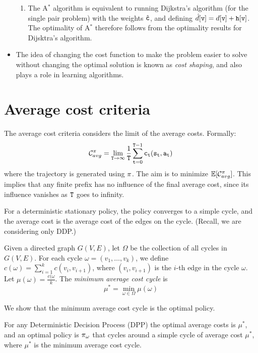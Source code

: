 \begin{itemize}
\begin{enumerate}
      \item The A$^*$ algorithm is equivalent to running Dijkstra's algorithm (for the single pair problem) with the weights $\hat{{\tt c}}$, and defining $\hat{d}[{\tt v}] = d[{\tt v}] + {\tt h}[{\tt v}]$. The optimality of A$^*$ therefore follows from the optimality results for Dijsktra's algorithm.
  \end{enumerate}
  \item The idea of changing the cost function to make the problem easier to solve without changing the optimal solution is known as \textit{cost shaping}, and also plays a role in learning algorithms.
\end{itemize}

\section{Average cost criteria}

The average cost criteria considers the limit of the average costs.
Formally:
\[
\mathcal{C}_{avg}^\pi=\lim_{{\tt T}\rightarrow \infty}
\frac{1}{{\tt T}} \sum_{{\tt t}=0}^{{\tt T}-1}
{\tt c}_{\tt t}({\tt s}_{\tt t},{\tt a}_{\tt t})
\]
where the trajectory is generated using $\pi$. The aim is to
minimize $\mathbb{E}[\mathcal{C}^\pi_{avg}]$. This implies that any finite
prefix has no influence of the final average cost, since its
influence vanishes as ${\tt T}$ goes to infinity.

For a deterministic stationary policy, the policy converges to a
simple cycle, and the average cost is the average cost of the edges
on the cycle. (Recall, we are considering only DDP.)

Given a directed graph $G(V,E)$, let $\Omega$ be the collection of
all cycles in $G(V,E)$. For each cycle $\omega=(v_1, \ldots ,
v_{k})$, we define $c(\omega)=\sum_{i=1}^k c(v_i,v_{i+1})$, where
$(v_i,v_{i+1})$ is the $i$-th edge in the cycle $\omega$. Let
$\mu(\omega)=\frac{c(\omega}{k}$. The {\em minimum average cost cycle}
is
\[
\mu^*=\min_{\omega\in\Omega} \mu(\omega)
\]

We show that the minimum average cost cycle is the optimal policy.
\begin{theorem}
For any Deterministic Decision Process (DPP) the optimal average
costs is $\mu^*$, and an optimal policy is $\pi_{\omega}$ that
cycles around a simple cycle of average cost $\mu^*$, where $\mu^*$ is the minimum average cost cycle.
\end{theorem}

